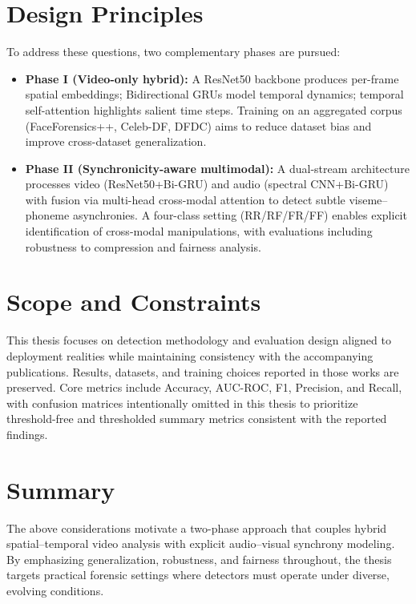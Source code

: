 \section{Design Principles}
To address these questions, two complementary phases are pursued:
\begin{itemize}
    \item \textbf{Phase I (Video-only hybrid):} A ResNet50 backbone produces per-frame spatial embeddings; Bidirectional GRUs model temporal dynamics; temporal self-attention highlights salient time steps. Training on an aggregated corpus (FaceForensics++, Celeb-DF, DFDC) aims to reduce dataset bias and improve cross-dataset generalization.
    \item \textbf{Phase II (Synchronicity-aware multimodal):} A dual-stream architecture processes video (ResNet50+Bi-GRU) and audio (spectral CNN+Bi-GRU) with fusion via multi-head cross-modal attention to detect subtle viseme–phoneme asynchronies. A four-class setting (RR/RF/FR/FF) enables explicit identification of cross-modal manipulations, with evaluations including robustness to compression and fairness analysis.
\end{itemize}

\section{Scope and Constraints}
This thesis focuses on detection methodology and evaluation design aligned to deployment realities while maintaining consistency with the accompanying publications. Results, datasets, and training choices reported in those works are preserved. Core metrics include Accuracy, AUC-ROC, F1, Precision, and Recall, with confusion matrices intentionally omitted in this thesis to prioritize threshold-free and thresholded summary metrics consistent with the reported findings.

\section{Summary}
The above considerations motivate a two-phase approach that couples hybrid spatial–temporal video analysis with explicit audio–visual synchrony modeling. By emphasizing generalization, robustness, and fairness throughout, the thesis targets practical forensic settings where detectors must operate under diverse, evolving conditions.